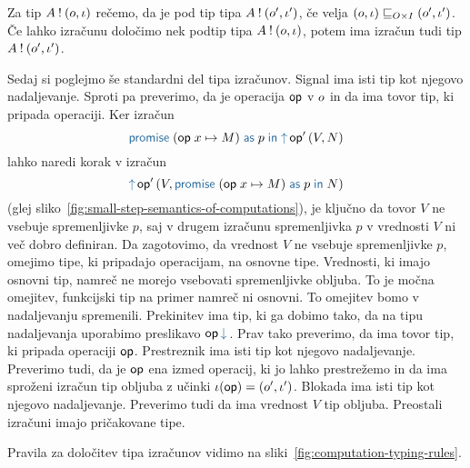 Za tip $A \mathbin{!} (o, \iota)$ rečemo, da je pod tip tipa $A \mathbin{!} (o', \iota')$, če velja $(o, \iota) \sqsubseteq_{O \times I} (o', \iota')$. Če lahko izračunu določimo nek podtip tipa $A \mathbin{!} (o, \iota)$, potem ima izračun tudi tip $A \mathbin{!} (o', \iota')$.

Sedaj si poglejmo še standardni del tipa izračunov.
Signal ima isti tip kot njegovo nadaljevanje. Sproti pa preverimo, da je operacija $\mathsf{op}$ v $o$ in da ima tovor tip, ki pripada operaciji.
Ker izračun 
$$ \tmwith{op}{x}{M}{p}{\tmopout{op'}{V}{N}} $$
lahko naredi korak v izračun
$$ \tmopout{op'}{V}{\tmwith{op}{x}{M}{p}{N}}$$
(glej sliko~\ref{fig:small-step-semantics-of-computations}),
je ključno da tovor $V$ ne vsebuje spremenljivke $p$, saj v drugem izračunu spremenljivka $p$ v vrednosti $V$ ni več dobro definiran. Da zagotovimo, da vrednost $V$ ne vsebuje spremenljivke $p$, omejimo tipe, ki pripadajo operacijam, na osnovne tipe. Vrednosti, ki imajo osnovni tip, namreč ne morejo vsebovati spremenljivke obljuba. To je močna omejitev, funkcijski tip na primer namreč ni osnovni. To omejitev bomo v nadaljevanju spremenili.
Prekinitev ima tip, ki ga dobimo tako, da na tipu nadaljevanja uporabimo preslikavo $\opincomp{op}$. Prav tako preverimo, da ima tovor tip, ki pripada operaciji $\mathsf{op}$. 
Prestreznik ima isti tip kot njegovo nadaljevanje. Preverimo tudi, da je $\mathsf{op}$ ena izmed operacij, ki jo lahko prestrežemo in da ima sproženi izračun tip obljuba z učinki $\iota(\mathsf{op}) = (o', \iota')$.
Blokada ima isti tip kot njegovo nadaljevanje. Preverimo tudi da ima vrednost $V$ tip obljuba. 
Preostali izračuni imajo pričakovane tipe.

Pravila za določitev tipa izračunov vidimo na sliki~\ref{fig:computation-typing-rules}.

